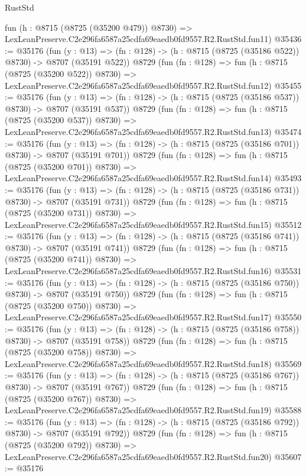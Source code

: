 \begin{lexlean}{RustStd}
\begin{coremodule}
    fun (h : @8715 (@8725 (@35200 @479)) @8730) =>
    LexLeanPreserve.C2e296fa6587a25cdfa69eaedb0fd9557.R2.RustStd.fun11)
@35436 := @35176
    (fun (y : @13) => (fn : @128) -> (h : @8715 (@8725 (@35186 @522)) @8730) -> @8707 (@35191 @522))
    @8729
    (fun (fn : @128) =>
    fun (h : @8715 (@8725 (@35200 @522)) @8730) =>
    LexLeanPreserve.C2e296fa6587a25cdfa69eaedb0fd9557.R2.RustStd.fun12)
@35455 := @35176
    (fun (y : @13) => (fn : @128) -> (h : @8715 (@8725 (@35186 @537)) @8730) -> @8707 (@35191 @537))
    @8729
    (fun (fn : @128) =>
    fun (h : @8715 (@8725 (@35200 @537)) @8730) =>
    LexLeanPreserve.C2e296fa6587a25cdfa69eaedb0fd9557.R2.RustStd.fun13)
@35474 := @35176
    (fun (y : @13) => (fn : @128) -> (h : @8715 (@8725 (@35186 @701)) @8730) -> @8707 (@35191 @701))
    @8729
    (fun (fn : @128) =>
    fun (h : @8715 (@8725 (@35200 @701)) @8730) =>
    LexLeanPreserve.C2e296fa6587a25cdfa69eaedb0fd9557.R2.RustStd.fun14)
@35493 := @35176
    (fun (y : @13) => (fn : @128) -> (h : @8715 (@8725 (@35186 @731)) @8730) -> @8707 (@35191 @731))
    @8729
    (fun (fn : @128) =>
    fun (h : @8715 (@8725 (@35200 @731)) @8730) =>
    LexLeanPreserve.C2e296fa6587a25cdfa69eaedb0fd9557.R2.RustStd.fun15)
@35512 := @35176
    (fun (y : @13) => (fn : @128) -> (h : @8715 (@8725 (@35186 @741)) @8730) -> @8707 (@35191 @741))
    @8729
    (fun (fn : @128) =>
    fun (h : @8715 (@8725 (@35200 @741)) @8730) =>
    LexLeanPreserve.C2e296fa6587a25cdfa69eaedb0fd9557.R2.RustStd.fun16)
@35531 := @35176
    (fun (y : @13) => (fn : @128) -> (h : @8715 (@8725 (@35186 @750)) @8730) -> @8707 (@35191 @750))
    @8729
    (fun (fn : @128) =>
    fun (h : @8715 (@8725 (@35200 @750)) @8730) =>
    LexLeanPreserve.C2e296fa6587a25cdfa69eaedb0fd9557.R2.RustStd.fun17)
@35550 := @35176
    (fun (y : @13) => (fn : @128) -> (h : @8715 (@8725 (@35186 @758)) @8730) -> @8707 (@35191 @758))
    @8729
    (fun (fn : @128) =>
    fun (h : @8715 (@8725 (@35200 @758)) @8730) =>
    LexLeanPreserve.C2e296fa6587a25cdfa69eaedb0fd9557.R2.RustStd.fun18)
@35569 := @35176
    (fun (y : @13) => (fn : @128) -> (h : @8715 (@8725 (@35186 @767)) @8730) -> @8707 (@35191 @767))
    @8729
    (fun (fn : @128) =>
    fun (h : @8715 (@8725 (@35200 @767)) @8730) =>
    LexLeanPreserve.C2e296fa6587a25cdfa69eaedb0fd9557.R2.RustStd.fun19)
@35588 := @35176
    (fun (y : @13) => (fn : @128) -> (h : @8715 (@8725 (@35186 @792)) @8730) -> @8707 (@35191 @792))
    @8729
    (fun (fn : @128) =>
    fun (h : @8715 (@8725 (@35200 @792)) @8730) =>
    LexLeanPreserve.C2e296fa6587a25cdfa69eaedb0fd9557.R2.RustStd.fun20)
@35607 := @35176

\end{coremodule}
\end{lexlean}
